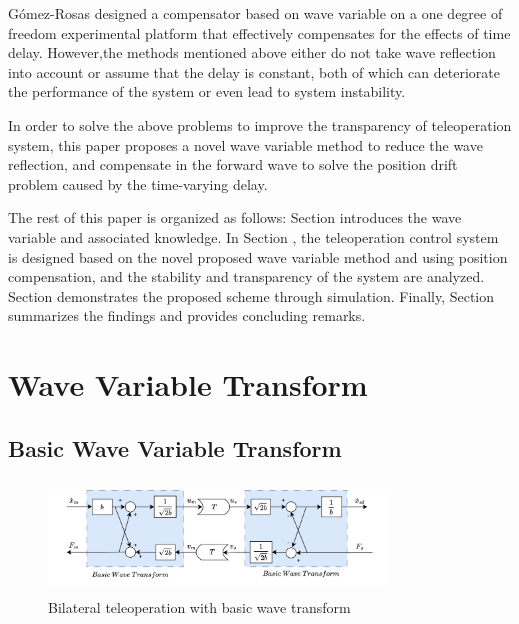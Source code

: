 Gómez-Rosas designed a compensator based on wave variable
on a one degree of freedom experimental platform
that effectively compensates for the effects of time delay\cite{b12}.
However,the methods mentioned above either do not take wave reflection into account
or assume that the delay is constant,
both of which can deteriorate the performance of the system
or even lead to system instability.
\par In order to solve the above problems to improve the transparency of teleoperation system,
this paper proposes a novel wave variable method to reduce the wave reflection,
and compensate in the forward wave to solve the position drift problem
caused by the time-varying  delay.
\par The rest of this paper is organized as follows:
Section \uppercase\expandafter{} introduces the wave variable and associated knowledge.
In Section \uppercase\expandafter{},
the teleoperation control system is designed based on the novel proposed wave variable method
and using position compensation, and the stability and transparency of the system are analyzed.
Section \uppercase\expandafter{} demonstrates the proposed scheme through simulation.
Finally, Section \uppercase\expandafter{} summarizes the findings and provides concluding remarks.


\section{Wave Variable Transform}

\subsection{Basic Wave Variable Transform}
\begin{figure}[htbp]
    \centerline{\includegraphics[height=3cm,width=9cm]{basic_wave.jpg}}
    \caption{Bilateral teleoperation with basic wave transform}
    \label{fig1}
\end{figure}

